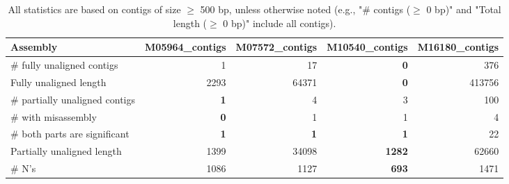 \documentclass[12pt,a4paper]{article}
\begin{document}
\begin{table}[ht]
\begin{center}
\caption{All statistics are based on contigs of size $\geq$ 500 bp, unless otherwise noted (e.g., "\# contigs ($\geq$ 0 bp)" and "Total length ($\geq$ 0 bp)" include all contigs).}
\begin{tabular}{|l*{4}{|r}|}
\hline
Assembly & M05964\_contigs & M07572\_contigs & M10540\_contigs & M16180\_contigs \\ \hline
\# fully unaligned contigs & 1 & 17 & {\bf 0} & 376 \\ \hline
Fully unaligned length & 2293 & 64371 & {\bf 0} & 413756 \\ \hline
\# partially unaligned contigs & {\bf 1} & 4 & 3 & 100 \\ \hline
\hspace{5mm}\# with misassembly & {\bf 0} & 1 & 1 & 4 \\ \hline
\hspace{5mm}\# both parts are significant & {\bf 1} & {\bf 1} & {\bf 1} & 22 \\ \hline
Partially unaligned length & 1399 & 34098 & {\bf 1282} & 62660 \\ \hline
\# N's & 1086 & 1127 & {\bf 693} & 1471 \\ \hline
\end{tabular}
\end{center}
\end{table}
\end{document}
